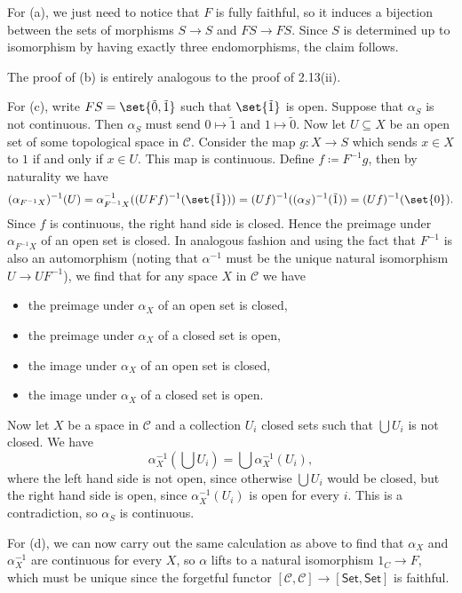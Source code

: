 For (a), we just need to notice that $F$ is fully faithful, so it induces a
bijection between the sets of morphisms $S\to S$ and $FS \to FS$. Since $S$ is
determined up to isomorphism by having exactly three endomorphisms, the claim
follows.

The proof of (b) is entirely analogous to the proof of 2.13(ii).

For (c), write $FS = \set{\tilde{0}, \tilde{1}}$ such that $\set{\tilde{1}}$ is open.
Suppose that $\alpha_S$ is not continuous. Then $\alpha_S$ must send
$0 \mapsto \tilde{1}$ and $1\mapsto \tilde{0}$. Now let $U \subseteq X$ be an
open set of some topological space in $\mathcal{C}$. Consider the map $g\colon X\to S$ which sends $x \in X$ to $1$ if and only if
$x \in U$. This map is continuous. Define $f\coloneqq F^{-1}g$, then by naturality
we have
\[ (\alpha_{F^{-1}X})^{-1}(U) = \alpha_{F^{-1}X}^{-1}((UFf)^{-1}(\set{\tilde{1}})) = (Uf)^{-1}((\alpha_S)^{-1}(\tilde{1})) = (Uf)^{-1}(\set{0}). \]
Since $f$ is continuous, the right hand side is closed. Hence the preimage under $\alpha_{F^{-1}X}$ of an open
set is closed. In analogous fashion and using the fact that $F^{-1}$ is also an automorphism
(noting that $\alpha^{-1}$ must be the unique natural isomorphism $U\to UF^{-1}$),
we find that for any space  $X$ in $\mathcal{C}$ we have
\begin{itemize}
	\item the preimage under $\alpha_X$ of an open set is closed,
	\item the preimage under $\alpha_X$ of a closed set is open,
	\item the image under $\alpha_X$ of an open set is closed,
	\item the image under $\alpha_X$ of a closed set is open.
\end{itemize}
Now let $X$ be a space in $\mathcal{C}$ and a collection $U_i$ closed sets such
that $\bigcup U_i$ is not closed. We have
\[ \alpha_X^{-1}(\bigcup U_i) = \bigcup \alpha_X^{-1}(U_i), \]
where the left hand side is not open, since otherwise $\bigcup U_i$ would be closed,
but the right hand side is open, since $\alpha_X^{-1}(U_i)$ is open for every $i$.
This is a contradiction, so $\alpha_S$ is continuous.

For (d), we can now carry out the same calculation as above to find that
$\alpha_X$ and $\alpha_X^{-1}$ are continuous for every $X$, so $\alpha$ lifts to a natural isomorphism
$1_C\to F$, which must be unique since the forgetful functor $[\mathcal{C}, \mathcal{C}]\to [\mathsf{Set}, \mathsf{Set}]$
is faithful.

